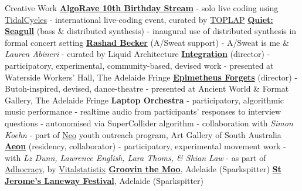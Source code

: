 \begin{rubric}{Creative Work}
         \href{https://youtu.be/fZZstGQxjpU}{\textbf{AlgoRave 10th Birthday Stream}}
         \entry* - solo live coding using \href{http://tidalcycles.org/}{TidalCycles}
         \entry* - international live-coding event, curated by \href{https://toplap.org/about/}{TOPLAP}
      \entry*[2021]
         \href{https://www.temporubato.com.au/tempo-concerts/qsg}{\textbf{Quiet: Seagull}} (bass \& distributed synthesis)
         \entry* - inaugural use of distributed synthesis in formal concert setting
      \entry*[2018]
         \href{https://liquidarchitecture.org.au/events/rashad-becker-adelaide}{\textbf{Rashad Becker}} (A/Sweat support)
            \entry* - A/Sweat is me \& \textit{Lauren Abineri}
            \entry* - curated by Liquid Architecture
      \entry*[2017]
         \href{http://www.fineprintmagazine.com/integration}{\textbf{Integration}} (director)
         \entry* - participatory, experimental, community-based, devised work
         \entry* - presented at Waterside Workers' Hall, The Adelaide Fringe
      \entry*[2016]
         \href{https://youtu.be/86Ra-5fDEsE}{\textbf{Epimetheus Forgets}} (director)
         \entry* - Butoh-inspired, devised, dance-theatre
         \entry* - presented at Ancient World \& Format Gallery, The Adelaide Fringe
      \entry*[2016]
         \textbf{Laptop Orchestra}
         \entry* - participatory, algorithmic music performance
         \entry* - realtime audio from participants' responses to interview questions
         \entry* - autonomised via SuperCollider algorithm
         \entry* - collaboration with \textit{Simon Koehn}
         \entry* - part of \href{https://www.agsa.sa.gov.au/whats-on/ongoing-programs/neo/}{Neo} youth outreach program, Art Gallery of South Australia
      \entry*[2016] 
         \href{https://vitalstatistix.com.au/residencies/aeon-2/}{\textbf{Aeon}} (residency, collaborator)
         \entry* - participatory, experimental movement work
         \entry* - with \textit{Lz Dunn, Lawrence English, Lara Thoms, \& Shian Law}
         \entry* - as part of \href{https://vitalstatistix.com.au/projects/adhocracy-2016-2/}{Adhocracy}, by \href{https://vitalstatistix.com.au/about/vitalstatistix/}{Vitalstatistix}
      \entry*[2015]
         \href{https://musicfeeds.com.au/news/groovin-the-moo-lineup-expands-with-8-new-acts/#/slide/1}{\textbf{Groovin the Moo}}, Adelaide (Sparkspitter)
      \entry*[2015]
         \href{https://musicfeeds.com.au/news/laneway-festival-2015-lineup/}{\textbf{St Jerome's Laneway Festival}}, Adelaide (Sparkspitter)
\end{rubric}

